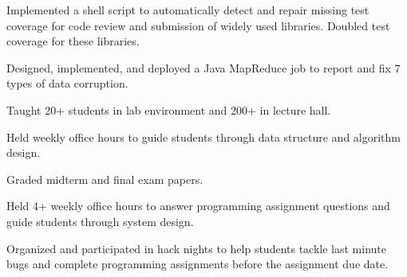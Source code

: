 \documentclass[letterpaper]{deedy-resume} %
\begin{document}
\begin{minipage}[t]{0.66\textwidth}
\sectionspace %




\begin{tightitemize}
\item Implemented a shell script to automatically detect and repair missing test coverage for code review and submission of widely used libraries. Doubled test coverage for these libraries.
\item Designed, implemented, and deployed a Java MapReduce job to report and fix 7 types of data corruption.
\end{tightitemize}

\sectionspace %



\begin{tightitemize}
\item Taught 20+ students in lab environment and 200+ in lecture hall.
\item Held weekly office hours to guide students through data structure and algorithm design.
\item Graded midterm and final exam papers.
\end{tightitemize}

\sectionspace %

\begin{tightitemize}
\item Held 4+ weekly office hours to answer programming assignment questions and guide students through system design.
\item Organized and participated in hack nights to help students tackle last minute bugs and complete programming assignments before the assignment due date.
\end{tightitemize}

\sectionspace %



\end{minipage}
\end{document}
